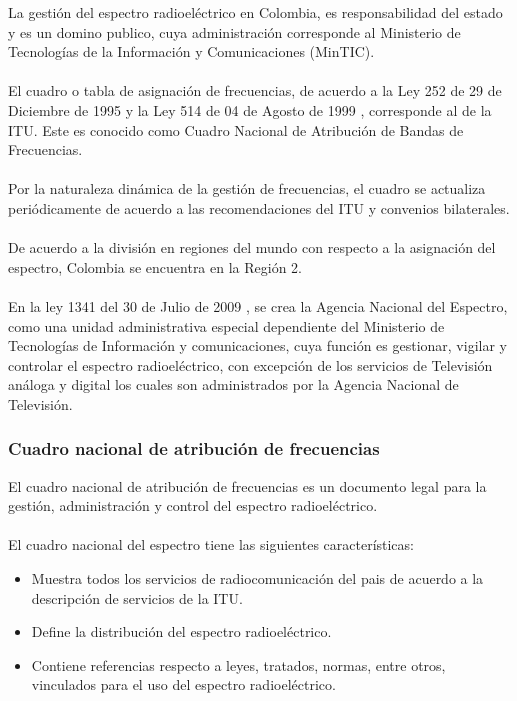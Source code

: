 La gestión del espectro radioeléctrico en Colombia, es responsabilidad del estado y es un domino publico, cuya administración corresponde al Ministerio de Tecnologías de la Información y Comunicaciones (MinTIC).
\\ \\
El cuadro o tabla de asignación de frecuencias, de acuerdo a la Ley 252 de 29 de Diciembre de 1995 \cite{Ley252} y la Ley 514 de 04 de Agosto de 1999 \cite{Ley514} , corresponde al de la ITU. Este es conocido como Cuadro Nacional de Atribución de Bandas de Frecuencias.
\\ \\
Por la naturaleza dinámica de la gestión de frecuencias, el cuadro se actualiza periódicamente de acuerdo a las recomendaciones del ITU y convenios bilaterales.
\\ \\
De acuerdo a la división en regiones del mundo con respecto a la asignación del espectro, Colombia se encuentra en la Región 2.
\\ \\
En la ley 1341 del 30 de Julio de 2009 \cite{Ley1341}, se crea la Agencia Nacional del Espectro, como una unidad administrativa especial dependiente del Ministerio de Tecnologías de Información y comunicaciones, cuya función es gestionar, vigilar y controlar el espectro radioeléctrico, con excepción de los servicios de Televisión análoga y digital los cuales son administrados por la Agencia Nacional de Televisión.

\subsubsection{Cuadro nacional de atribución de frecuencias}

El cuadro nacional de atribución de frecuencias \cite{Cuadro} es un documento legal para la gestión, administración y control del espectro radioeléctrico.
\\\\
El cuadro nacional del espectro tiene las siguientes características:
\begin{itemize}
	\item Muestra todos los servicios de radiocomunicación del pais de acuerdo a la descripción de servicios de la ITU.
	\item Define la distribución del espectro radioeléctrico.
	\item Contiene referencias respecto a leyes, tratados, normas, entre otros, vinculados para el uso del espectro radioeléctrico.
\end{itemize}

